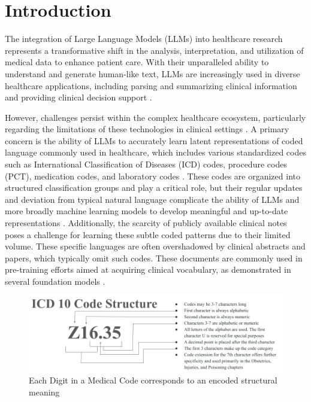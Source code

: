 \documentclass[11pt]{article}
\theoremstyle{plain}
\theoremstyle{definition}
\theoremstyle{remark}
\begin{document}
\section{Introduction}

The integration of Large Language Models (LLMs) into healthcare research represents a transformative shift in the analysis, interpretation, and utilization of medical data to enhance patient care. With their unparalleled ability to understand and generate human-like text, LLMs are increasingly used in diverse healthcare applications, including parsing \cite{goel2023llms} and summarizing clinical information \cite{van2023clinical} and providing clinical decision support \cite{lee2024emergency, cui2024llmsbased, jiang2023health}.

However, challenges persist within the complex healthcare ecosystem, particularly regarding the limitations of these technologies in clinical settings \citep{wornow2023shaky}. A primary concern is the ability of LLMs to accurately learn latent representations of coded language commonly used in healthcare, which includes various standardized codes such as International Classification of Diseases (ICD) codes, procedure codes (PCT), medication codes, and laboratory codes \citep{cimino1996coding, alexander2003overview}. These codes are organized into structured classification groups and play a critical role, but their regular updates and deviation from typical natural language complicate the ability of LLMs and more broadly machine learning models to develop meaningful and up-to-date representations \cite{cartwright2013icd}. Additionally, the scarcity of publicly available clinical notes poses a challenge for learning these subtle coded patterns due to their limited volume. These specific languages are often overshadowed by clinical abstracts and papers, which typically omit such codes. These documents are commonly used in pre-training efforts aimed at acquiring clinical vocabulary, as demonstrated in several foundation models \cite{alsentzer2019publicly, bolton2024biomedlm}.

 \begin{figure}[t]
   \centering 
   \includegraphics[width=\textwidth]{icd.png} 
   \caption{Each Digit in a Medical Code corresponds to an encoded structural meaning}
   \label{fig111} 
 \end{figure} 
\end{document}
